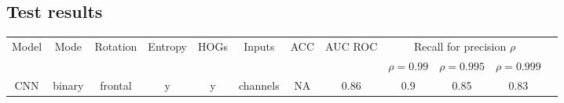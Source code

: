     \subsection{Test results}
        \begin{tabular}{ |c|c|c|c|c|c|c|c|c|c|c|c| }
            \hline
            \multirow{2}{*}{Model} &
            \multirow{2}{*}{Mode} &
            \multirow{2}{*}{Rotation} &
            \multirow{2}{*}{Entropy} &
            \multirow{2}{*}{HOGs} &
            \multirow{2}{*}{Inputs} &
            \multirow{2}{*}{ACC} &
            \multirow{2}{*}{AUC ROC} &
            \multicolumn{3}{|c|}{Recall for precision $\rho$} \\
            & & & & & & & & $\rho = 0.99$ & $\rho = 0.995$ & $\rho = 0.999$ \\
            \hline
            CNN & binary & frontal & y & y & channels & NA & 0.86 & 0.9 & 0.85 & 0.83 \\
            \hline
        \end{tabular}
